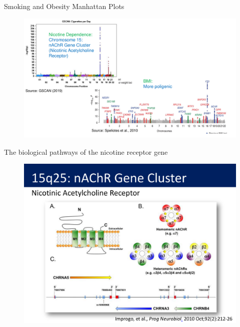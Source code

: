 \documentclass[10pt,compress,xcolor=dvipsnames,aspectratio=169]{beamer}    %
\newcounter{ex}
\newcommand{\1}[1]{\mathrm{1\hspace*{-2.5pt}l}[#1]}	%
\begin{document}
\begin{frame}{Smoking and Obesity Manhattan Plots}
\begin{figure}
  \centering
    \includegraphics[height=0.8\textheight]{GWAS_manhattanplots.pdf}
  \label{fig:manhattan2}
\end{figure}

\hyperlink{frame:genetics}{}

\end{frame}


\begin{frame}{The biological pathways of the nicotine receptor gene}
\begin{figure}
  \centering
    \includegraphics[height=0.8\textheight]{chr15q25_biology.pdf}
\end{figure}

\end{frame}
\end{document}
